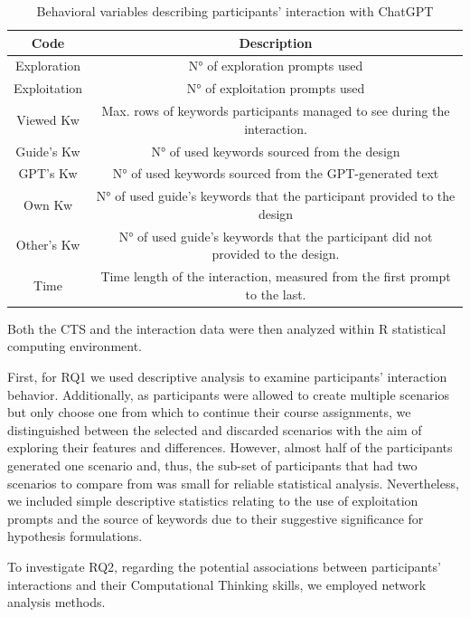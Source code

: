 \documentclass[sn-mathphys, Numbered]{sn-jnl}%
\theoremstyle{thmstyleone}%
\theoremstyle{thmstyletwo}%
\theoremstyle{thmstylethree}%
\begin{document}
\begin{table} \caption{Behavioral variables describing participants' interaction with ChatGPT}
    \centering
    \begin{tabular}{c|c} 
      \hline
         Code& Description\\ 
         \hline
         Exploration& N° of exploration prompts used\\ 
         Exploitation& N° of exploitation prompts used\\ 
         Viewed Kw& Max. rows of keywords participants managed to see during the interaction.\\ 
         Guide's Kw& N° of used keywords sourced from the design\\ 
         GPT's Kw& N° of used keywords sourced from the GPT-generated text\\ 
         Own Kw& N° of used guide's keywords that the participant provided to the design\\ 
         Other's Kw& N° of used guide's keywords that the participant did not provided to the design.\\ 
         Time& Time length of the interaction, measured from the first prompt to the last.\\ 
           \hline
    \end{tabular}
    \label{tab:interaction variables}
\end{table}


Both the CTS and the interaction data were then analyzed within R statistical computing environment.

First, for RQ1 we used descriptive analysis to examine participants' interaction behavior. 
Additionally, as participants were allowed to create multiple scenarios but only choose one from which to continue their course assignments, we distinguished between the selected and discarded scenarios with the aim of exploring their features and differences. However, almost half of the participants generated one scenario and, thus, the sub-set of participants that had two scenarios to compare from was small for reliable statistical analysis. Nevertheless, we included simple descriptive statistics relating to the use of exploitation prompts and the source of keywords due to their suggestive significance for hypothesis formulations. 

To investigate RQ2, regarding the potential associations between participants' interactions and their Computational Thinking skills, we employed network analysis methods.
\end{document}
